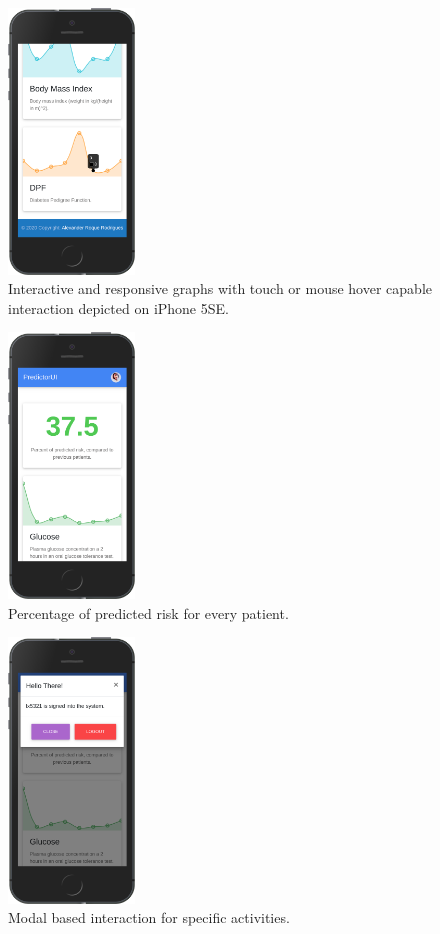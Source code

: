 \documentclass[12pt]{article}
\begin{document}
\begin{figure}[ht]
\centering
\includegraphics[width=0.3\textwidth]{3se.png}
\caption{\label{fig:52} Interactive and responsive graphs with touch or mouse hover capable interaction depicted on iPhone 5SE.}
\end{figure}
\begin{figure}[ht]
\centering
\includegraphics[width=0.3\textwidth]{4se.png}
\caption{\label{fig:53} Percentage of predicted risk for every patient.}
\end{figure}
\begin{figure}[ht]
\centering
\includegraphics[width=0.3\textwidth]{5se.png}
\caption{\label{fig:54} Modal based interaction for specific activities.}
\end{figure}
\end{document}
